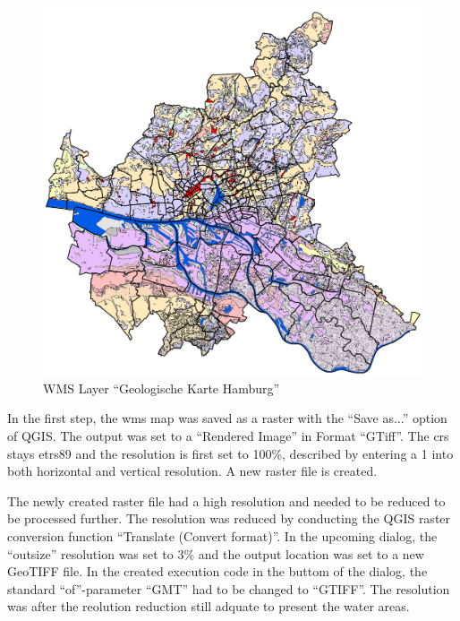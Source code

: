 \documentclass[a4paper, 11pt, oneside]{Thesis}  %
\begin{document}
\begin{figure}[h]
\includegraphics[scale=0.5]{Figures/WMS_Layer_Geologische_Karte.png}
\centering
\caption{WMS Layer ``Geologische Karte Hamburg''}
\label{fig:geologische_karte}
\end{figure}

In the first step, the \ac{wms} map was saved as a raster with the ``Save as...'' option of QGIS. The output was set to a ``Rendered Image'' in Format ``GTiff''. The \ac{crs} stays \ac{etrs89} and the resolution is first set to 100\%, described by entering a 1 into both horizontal and vertical resolution. A new raster file is created.

The newly created raster file had a high resolution and needed to be reduced to be processed further. The resolution was reduced by conducting the QGIS raster conversion function ``Translate (Convert format)''. In the upcoming dialog, the ``outsize'' resolution was set to 3\% and the output location was set to a new GeoTIFF file. In the created execution code in the buttom of the dialog, the standard ``of''-parameter ``GMT'' had to be changed to ``GTIFF''. The resolution was after the reolution reduction still adquate to present the water areas.
\end{document}
